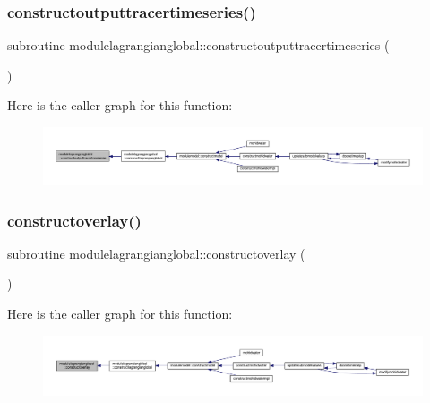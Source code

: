 \subsubsection{\texorpdfstring{constructoutputtracertimeseries()}{constructoutputtracertimeseries()}}
{\footnotesize\ttfamily subroutine modulelagrangianglobal\+::constructoutputtracertimeseries (\begin{DoxyParamCaption}{ }\end{DoxyParamCaption})\hspace{0.3cm}{\ttfamily [private]}}

Here is the caller graph for this function\+:\nopagebreak
\begin{figure}[H]
\begin{center}
\leavevmode
\includegraphics[width=350pt]{namespacemodulelagrangianglobal_a43f3d0f411e8d9b0df16d63f033382ff_icgraph}
\end{center}
\end{figure}
\mbox{\label{namespacemodulelagrangianglobal_a66523dedf972d121569f3902f6d4a148}} 
\subsubsection{\texorpdfstring{constructoverlay()}{constructoverlay()}}
{\footnotesize\ttfamily subroutine modulelagrangianglobal\+::constructoverlay (\begin{DoxyParamCaption}{ }\end{DoxyParamCaption})\hspace{0.3cm}{\ttfamily [private]}}

Here is the caller graph for this function\+:\nopagebreak
\begin{figure}[H]
\begin{center}
\leavevmode
\includegraphics[width=350pt]{namespacemodulelagrangianglobal_a66523dedf972d121569f3902f6d4a148_icgraph}
\end{center}
\end{figure}
\mbox{\label{namespacemodulelagrangianglobal_ab6e9439dc837db2093ed5e4108e57726}} 
